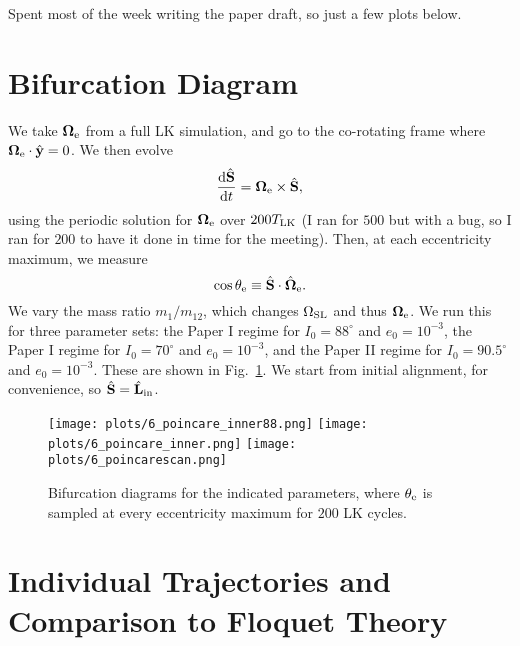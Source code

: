 \documentclass[11pt,
        usenames, %
        dvipsnames %
    ]{article}
\newcommand*{\rd}[2]{\frac{\mathrm{d}#1}{\mathrm{d}#2}}
\newcommand*{\bm}[1]{\boldsymbol{\mathbf{#1}}}
\newcommand*{\uv}[1]{\hat{\bm{#1}}}
\begin{document}
\def\Snospace~{\S{}} %
\renewcommand*{\sectionautorefname}{\Snospace}
\renewcommand*{\appendixautorefname}{\Snospace}
\renewcommand*{\figureautorefname}{Fig.}
\renewcommand*{\equationautorefname}{Eq.}
\renewcommand*{\tableautorefname}{Tab.}

Spent most of the week writing the paper draft, so just a few plots below.

\section{Bifurcation Diagram}

We take $\bm{\Omega}_{\rm e}$ from a full LK simulation, and go to the
co-rotating frame where $\bm{\Omega}_{\rm e} \cdot \uv{y} = 0$. We then evolve
\begin{equation}
    \rd{\uv{S}}{t} = \bm{\Omega}_{\rm e} \times \uv{S},\label{eq:eom}
\end{equation}
using the periodic solution for $\bm{\Omega}_{\rm e}$ over $200 T_{\rm LK}$ (I
ran for $500$ but with a bug, so I ran for $200$ to have it done in time for the
meeting). Then, at each eccentricity maximum, we measure
\begin{equation}
    \cos \theta_{\rm e} \equiv \uv{S} \cdot \uv{\Omega}_{\rm e}.
\end{equation}
We vary the mass ratio $m_1 / m_{12}$, which changes $\Omega_{\rm SL}$ and thus
$\bm{\Omega}_{\rm e}$. We run this for three parameter sets: the Paper I regime
for $I_0 = 88^\circ$ and $e_0 = 10^{-3}$, the Paper I regime for $I_0 =
70^\circ$ and $e_0 = 10^{-3}$, and the Paper II regime for $I_0 = 90.5^\circ$
and $e_0 = 10^{-3}$. These are shown in Fig.~\ref{fig:poincare}. We start from
initial alignment, for convenience, so $\uv{S} = \uv{L}_{\rm in}$.

\begin{figure}
    \centering
    \texttt{[image: plots/6\_poincare\_inner88.png]}
    \texttt{[image: plots/6\_poincare\_inner.png]}
    \texttt{[image: plots/6\_poincarescan.png]}
    \caption{Bifurcation diagrams for the indicated parameters, where
    $\theta_{\rm e}$ is sampled at every eccentricity maximum for $200$ LK
    cycles.}\label{fig:poincare}
\end{figure}

\section{Individual Trajectories and Comparison to Floquet Theory}
\end{document}
